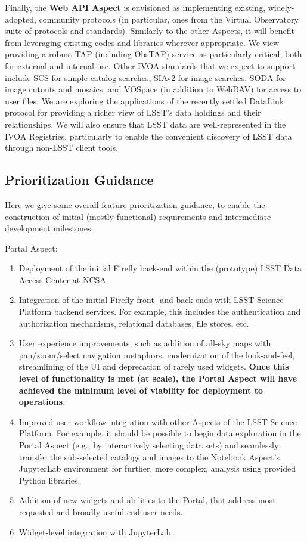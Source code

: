 Finally, the \textbf{Web API Aspect} is envisioned as implementing existing, widely-adopted, community protocols (in particular, ones from the Virtual Observatory suite of protocols and standards).
Similarly to the other Aspects, it will benefit from leveraging existing codes and libraries wherever appropriate.
We view providing a robust TAP (including ObsTAP) service \citep{2019ivoa.spec.0927D} as particularly critical, both for external and internal use.
Other IVOA standards that we expect to support include SCS \citep{2008ivoa.specQ0222P} for simple catalog searches, SIAv2 \citep{2015ivoa.spec.1223D} for image searches, SODA \citep{2017ivoa.spec.0517B} for image cutouts and mosaics, and VOSpace \citep{2018ivoa.spec.0621G} (in addition to WebDAV) for access to user files.
We are exploring the applications of the recently settled DataLink protocol for providing a richer view of LSST's data holdings and their relationships.
We will also ensure that LSST data are well-represented in the IVOA Registries, particularly to enable the convenient discovery of LSST data through non-LSST client tools.

\subsection{Prioritization Guidance}

Here we give some overall feature prioritization guidance, to enable the construction of initial (mostly functional) requirements and intermediate development milestones.

Portal Aspect:
\begin{enumerate}
	\item Deployment of the initial Firefly back-end within the (prototype) LSST Data Access Center at NCSA.
	\item Integration of the initial Firefly front- and back-ends with LSST Science Platform backend services. For example, this includes the authentication and authorization mechanisms, relational databases, file stores, etc.
	\item User experience improvements, such as addition of all-sky maps with pan/zoom/select navigation metaphors, modernization of the look-and-feel, streamlining of the UI and deprecation of rarely used widgets. \textbf{Once this level of functionality is met (at scale), the Portal Aspect will have achieved the minimum level of viability for deployment to operations}.
	\item Improved user workflow integration with other Aspects of the LSST Science Platform. For example, it should be possible to begin data exploration in the Portal Aspect (e.g., by interactively selecting data sets) and seamlessly transfer the sub-selected catalogs and images to the Notebook Aspect's JupyterLab environment for further, more complex, analysis using provided Python libraries.
	\item Addition of new widgets and abilities to the Portal, that address most requested and broadly useful end-user needs.
	\item Widget-level integration with JupyterLab.
\end{enumerate}

